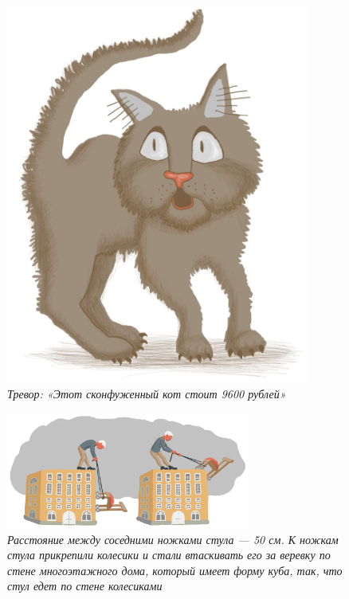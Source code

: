 \documentclass[10pt]{scrbook} \usepackage{modules/nonstahp_book}
\begin{document}
\begin{figure} \begin{center}
	\includegraphics[width=10cm]{figures/color/16c.jpg}
	\vspace{1cm}
	\caption{
             {\itshape Тревор: «Этот сконфуженный кот стоит 9600 рублей»}\medskip\\
             }
\end{center} \end{figure}

\begin{figure} \begin{center}
	\includegraphics[width=8cm]{figures/color/17c.jpg}
	\vspace{0.5cm}
	\caption{
             {\itshape  Расстояние между соседними ножками стула — 50 см. 
             К ножкам стула прикрепили колесики и стали втаскивать его за 
             веревку по стене многоэтажного дома, который имеет форму куба, 
             так, что стул едет по стене колесиками }\medskip\\
             }
\end{center} \end{figure}
\end{document}
